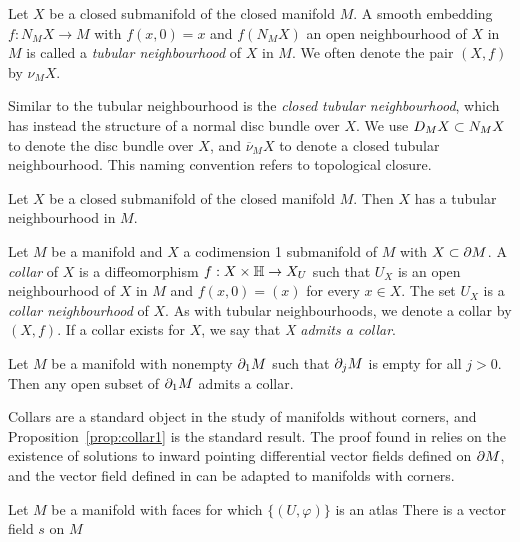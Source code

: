 \begin{defn}
	\label{def:tubularneighbourhood}
	Let $X$ be a closed submanifold of the closed manifold $M$.
	A smooth embedding $f:N_M X\to M$ with $f(x,0)=x$ and $f(N_M X)$ an open neighbourhood of $X$ in $M$ is called a \emph{tubular neighbourhood} of $X$ in $M$.
	We often denote the pair $(X,f)$ by $\nu_M X$.
\end{defn}

Similar to the tubular neighbourhood is the \emph{closed tubular neighbourhood}, which has instead the structure of a normal disc bundle over $X$.
We use $D_M X\subset N_M X$ to denote the disc bundle over $X$, and $\overline{\nu}_M X$ to denote a closed tubular neighbourhood.
This naming convention refers to topological closure.

\begin{theorem}
	\label{thm:tubularneighbourhood}
	Let $X$ be a closed submanifold of the closed manifold $M$.
	Then $X$ has a tubular neighbourhood in $M$.
\end{theorem}

\begin{defn}
	\label{defthm:collar}
	Let $M$ be a manifold and $X$ a codimension 1 submanifold of $M$ with $X\subset \partial M$.
	A \emph{collar} of $X$ is a diffeomorphism $f: X\times \mathbb{H}\to X_U$ such that $U_X$ is an open neighbourhood of $X$ in $M$ and $f(x,0)=(x)$ for every $x\in X$.
	The set $U_X$ is a \emph{collar neighbourhood} of $X$.
	As with tubular neighbourhoods, we denote a collar by $(X,f)$.
	If a collar exists for $X$, we say that \emph{X admits a collar}.
\end{defn}

\begin{prop}
	\label{prop:collar1}
	Let $M$ be a manifold with nonempty $\partial_1 M$ such that $\partial_j M$ is empty for all $j>0$.
	Then any open subset of $\partial_1 M$ admits a collar.
\end{prop}

Collars are a standard object in the study of manifolds without corners, and Proposition~\ref{prop:collar1} is the standard result.
The proof found in \cite{Kosi93} relies on the existence of solutions to inward pointing differential vector fields defined on $\partial M$, and the vector field defined in \cite{Kosi93} can be adapted to manifolds with corners.

\begin{prop}
	Let $M$ be a manifold with faces for which $\{(U,\varphi)\}$ is an atlas
	There is a vector field $s$ on $M$
	
\end{prop}

